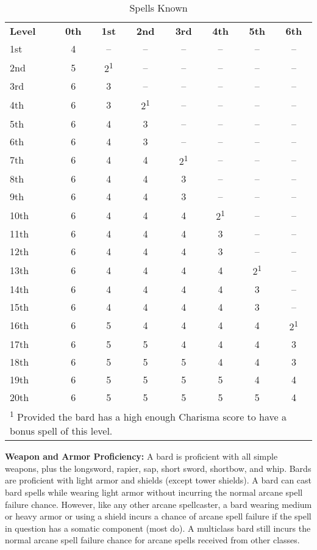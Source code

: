 \begin{wraptable}{O}{8.75cm}
\caption{\currentclassname{} Spells Known}
\begin{tabular}{l*{7}{c}}
\textbf{Level} & \textbf{0th} & \textbf{1st} & \textbf{2nd} & \textbf{3rd} & \textbf{4th} & \textbf{5th} & \textbf{6th} \\
1st & 4 & -- & -- & -- & -- & -- & --\\
2nd & 5 & 2\textsuperscript{1} & -- & -- & -- & -- & --\\
3rd & 6 & 3 & -- & -- & -- & -- & --\\
4th & 6 & 3 & 2\textsuperscript{1} & -- & -- & -- & --\\
5th & 6 & 4 & 3 & -- & -- & -- & --\\
6th & 6 & 4 & 3 & -- & -- & -- & --\\
7th & 6 & 4 & 4 & 2\textsuperscript{1} & -- & -- & --\\
8th & 6 & 4 & 4 & 3 & -- & -- & --\\
9th & 6 & 4 & 4 & 3 & -- & -- & --\\
10th & 6 & 4 & 4 & 4 & 2\textsuperscript{1} & -- & --\\
11th & 6 & 4 & 4 & 4 & 3 & -- & --\\
12th & 6 & 4 & 4 & 4 & 3 & -- & --\\
13th & 6 & 4 & 4 & 4 & 4 & 2\textsuperscript{1} & --\\
14th & 6 & 4 & 4 & 4 & 4 & 3 & --\\
15th & 6 & 4 & 4 & 4 & 4 & 3 & --\\
16th & 6 & 5 & 4 & 4 & 4 & 4 & 2\textsuperscript{1}\\
17th & 6 & 5 & 5 & 4 & 4 & 4 & 3\\
18th & 6 & 5 & 5 & 5 & 4 & 4 & 3\\
19th & 6 & 5 & 5 & 5 & 5 & 4 & 4\\
20th & 6 & 5 & 5 & 5 & 5 & 5 & 4\\
\multicolumn{8}{p{8.5cm}}{\cellcolor{white}\textsuperscript{1} Provided the bard has a high enough Charisma score to have a bonus spell of this level.}\\
\end{tabular}
\end{wraptable}

\classfeatures

\textbf{Weapon and Armor Proficiency:} A bard is proficient with all simple weapons, plus the longsword, rapier, sap, short sword, shortbow, and whip. Bards are proficient with light armor and shields (except tower shields). A bard can cast bard spells while wearing light armor without incurring the normal arcane spell failure chance. However, like any other arcane spellcaster, a bard wearing medium or heavy armor or using a shield incurs a chance of arcane spell failure if the spell in question has a somatic component (most do). A multiclass bard still incurs the normal arcane spell failure chance for arcane spells received from other classes.

